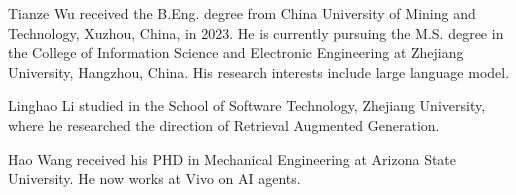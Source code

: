 \vspace{-3em}

\begin{IEEEbiography}{Tianze Wu}
received the B.Eng. degree from China University of Mining and Technology, Xuzhou, China, in 2023. He is currently pursuing the M.S. degree in the College of Information Science and Electronic Engineering at Zhejiang University, Hangzhou, China. His research interests include large language model.
\end{IEEEbiography}

\vspace{-3em}

\begin{IEEEbiography}{Linghao Li}
studied in the School of Software Technology, Zhejiang University, where he researched the direction of Retrieval Augmented Generation.
\end{IEEEbiography}

\vspace{-3em}

\begin{IEEEbiography}{Hao Wang}
received his PHD in Mechanical Engineering at Arizona State University. He now works at Vivo on AI agents.
\end{IEEEbiography}

